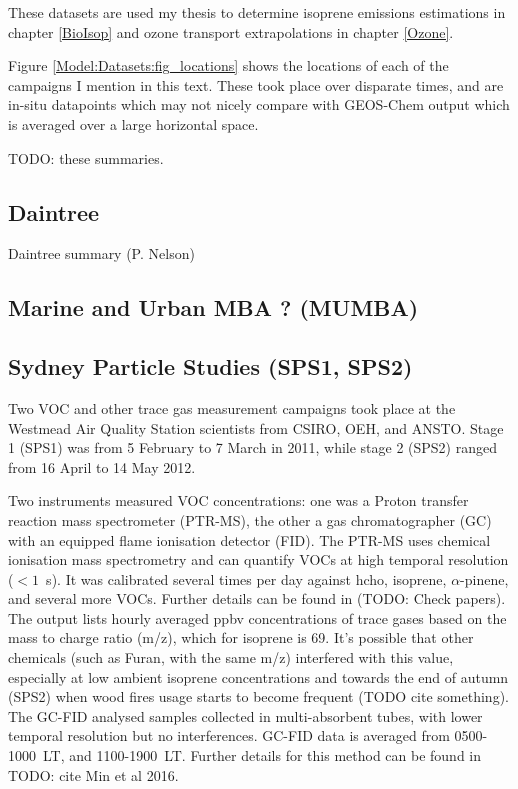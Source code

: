   These datasets are used my thesis to determine isoprene emissions estimations in chapter \ref{BioIsop} and ozone transport extrapolations in chapter \ref{Ozone}.
  
  Figure \ref{Model:Datasets:fig_locations} shows the locations of each of the campaigns I mention in this text.
  These took place over disparate times, and are in-situ datapoints which may not nicely compare with GEOS-Chem output which is averaged over a large horizontal space.
  
  
  TODO: these summaries.
  
  \subsection{Daintree}
    Daintree summary (P. Nelson)
  
  \subsection{Marine and Urban MBA ? (MUMBA)}
    \label{Model:Datasets:MUMBA}
  
  \subsection{Sydney Particle Studies (SPS1, SPS2)}
    \label{Model:Datasets:SPS}
    Two VOC and other trace gas measurement campaigns took place at the Westmead Air Quality Station scientists from CSIRO, OEH, and ANSTO. 
    Stage 1 (SPS1) was from 5 February to 7 March in 2011, while stage 2 (SPS2) ranged from 16 April to 14 May 2012.
    
    Two instruments measured VOC concentrations: one was a Proton transfer reaction mass spectrometer (PTR-MS), the other a gas chromatographer (GC) with an equipped flame ionisation detector (FID).
    The PTR-MS uses chemical ionisation mass spectrometry and can quantify VOCs at high temporal resolution ($< 1$~s).
    It was calibrated several times per day against hcho, isoprene, $\alpha$-pinene, and several more VOCs. Further details can be found in \textcite{Dunne2012, Dunne2017} (TODO: Check papers).
    The output lists hourly averaged ppbv concentrations of trace gases based on the mass to charge ratio (m/z), which for isoprene is 69.
    It's possible that other chemicals (such as Furan, with the same m/z) interfered with this value, especially at low ambient isoprene concentrations and towards the end of autumn (SPS2) when wood fires usage starts to become frequent (TODO cite something).
    The GC-FID analysed samples collected in multi-absorbent tubes, with lower temporal resolution but no interferences. GC-FID data is averaged from 0500-1000~LT, and 1100-1900~LT. Further details for this method can be found in TODO: cite Min et al 2016.
    
